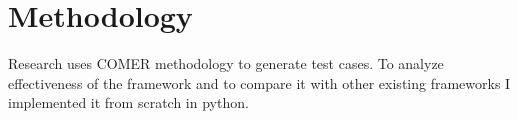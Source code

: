 \chapter{Methodology}
\label{chap:met}

Research uses COMER methodology to generate test cases. To analyze effectiveness of the framework and to compare it with other existing frameworks I implemented it from scratch in python.
